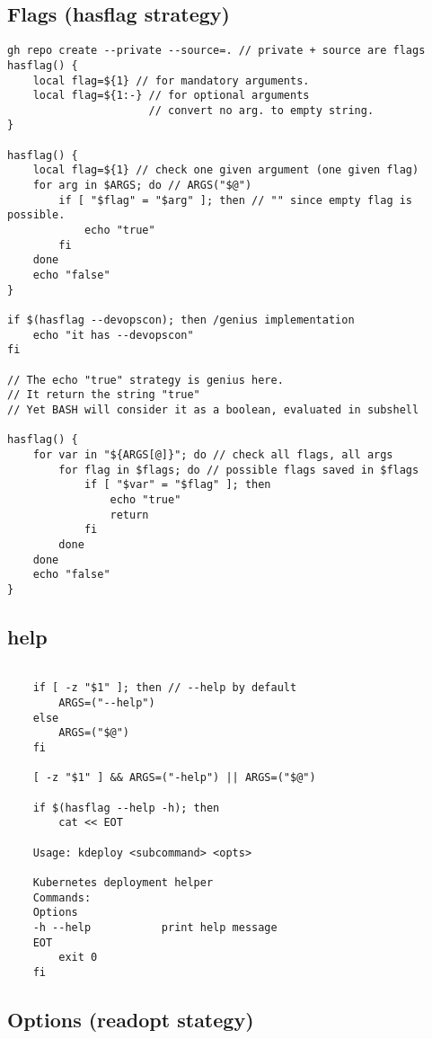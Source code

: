 \subsection{Flags (hasflag strategy)}

\begin{verbatim}
gh repo create --private --source=. // private + source are flags
hasflag() {
    local flag=${1} // for mandatory arguments. 
    local flag=${1:-} // for optional arguments
                      // convert no arg. to empty string. 
}

hasflag() {
    local flag=${1} // check one given argument (one given flag)
    for arg in $ARGS; do // ARGS("$@")
        if [ "$flag" = "$arg" ]; then // "" since empty flag is possible.
            echo "true"
        fi
    done
    echo "false"
}

if $(hasflag --devopscon); then /genius implementation
    echo "it has --devopscon"
fi

// The echo "true" strategy is genius here. 
// It return the string "true"
// Yet BASH will consider it as a boolean, evaluated in subshell

hasflag() {
    for var in "${ARGS[@]}"; do // check all flags, all args
        for flag in $flags; do // possible flags saved in $flags
            if [ "$var" = "$flag" ]; then
                echo "true"
                return
            fi
        done
    done
    echo "false"
}
\end{verbatim}

\subsection{help}

\begin{verbatim}

    if [ -z "$1" ]; then // --help by default
        ARGS=("--help")
    else
        ARGS=("$@")
    fi

    [ -z "$1" ] && ARGS=("-help") || ARGS=("$@")

    if $(hasflag --help -h); then
        cat << EOT
    
    Usage: kdeploy <subcommand> <opts>
    
    Kubernetes deployment helper
    Commands:
    Options
    -h --help           print help message
    EOT
        exit 0
    fi
\end{verbatim}

\subsection{Options (readopt stategy)}

